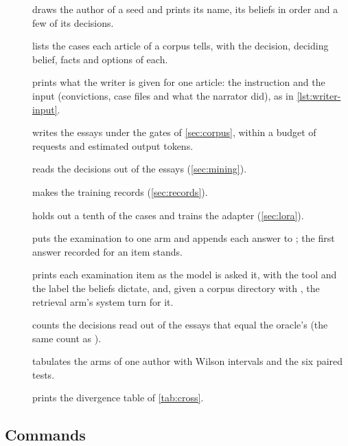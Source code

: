 \begin{description}
\item[] draws the author of a seed and prints its name, its beliefs in order and a few of its decisions.
\item[] lists the cases each article of a corpus tells, with the decision, deciding
  belief, facts and options of each.
\item[] prints what the writer is given for one article: the instruction and the
  input (convictions, case files and what the narrator did), as in \cref{lst:writer-input}.
\item[] writes the essays under the gates of \cref{sec:corpus}, within a budget of
  requests and estimated output tokens.
\item[] reads the decisions out of the essays (\cref{sec:mining}).
\item[] makes the training records (\cref{sec:records}).
\item[] holds out a tenth of the cases and trains the adapter (\cref{sec:lora}).
\item[] puts the examination to one arm and appends each answer to
  ; the first answer recorded for an item stands.
\item[] prints each examination item as the model is asked it, with the tool and
  the label the beliefs dictate, and, given a corpus directory with , the
  retrieval arm's system turn for it.
\item[] counts the decisions read out of the essays that equal the oracle's (the
  same count as ).
\item[] tabulates the arms of one author with Wilson intervals and the six paired
  tests.
\item[] prints the divergence table of \cref{tab:cross}.
\end{description}

\subsection{Commands}

